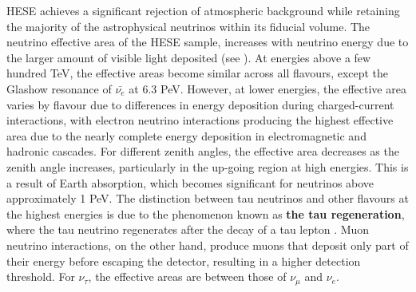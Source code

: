 HESE achieves a significant rejection of atmospheric background while retaining the majority of the astrophysical neutrinos within its fiducial volume. The neutrino effective area of the HESE sample, increases with neutrino energy due to the larger amount of visible light deposited (see ). At energies above a few hundred TeV, the effective areas become similar across all flavours, except the Glashow resonance of $\bar{\nu_e}$ at 6.3 PeV. However, at lower energies, the effective area varies by flavour due to differences in energy deposition during charged-current interactions, with electron neutrino interactions producing the highest effective area due to the nearly complete energy deposition in electromagnetic and hadronic cascades. For different zenith angles, the effective area decreases as the zenith angle increases, particularly in the up-going region at high energies. This is a result of Earth absorption, which becomes significant for neutrinos above approximately 1 PeV. The distinction between tau neutrinos and other flavours at the highest energies is due to the phenomenon known as \textbf{the tau regeneration}, where the tau neutrino regenerates after the decay of a tau lepton . Muon neutrino interactions, on the other hand, produce muons that deposit only part of their energy before escaping the detector, resulting in a higher detection threshold. For $\nu_\tau$, the effective areas are between those of $\nu_\mu$ and $\nu_e$.


